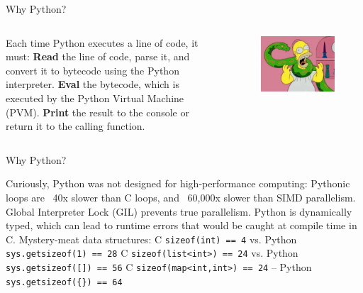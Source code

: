 \documentclass[aspectratio=169]{beamer}
\begin{document}
    \begin{frame}{Why Python?}
        \begin{columns}
            \begin{column}{0.5\linewidth}
                \begin{outline}
                    \1 Each time Python executes a line of code, it must:
                        \2 \textbf{Read} the line of code, parse it, and convert it to bytecode using the Python interpreter.
                        \2 \textbf{Eval} the bytecode, which is executed by the Python Virtual Machine (PVM).
                        \2 \textbf{Print} the result to the console or return it to the calling function.
                \end{outline}
            \end{column}
            \begin{column}{0.5\linewidth}
                \begin{figure}[H]
                    \centering
                    \includegraphics[width=0.9\linewidth]{python.png}
                \end{figure}
            \end{column}
        \end{columns}
    \end{frame}

    \begin{frame}{Why Python?}
        \begin{outline}
            \1 Curiously, Python was not designed for high-performance computing:
                \2 Pythonic loops are ~40x slower than C loops, and ~60,000x slower than SIMD parallelism.
                \2 Global Interpreter Lock (GIL) prevents true parallelism.
                \2 Python is dynamically typed, which can lead to runtime errors that would be caught at compile time in C.
                \2 Mystery-meat data structures:
                    \3 C \texttt{sizeof(int) == 4} \quad vs. \quad Python \texttt{sys.getsizeof(1) == 28}
                    \3 C \texttt{sizeof(list<int>) == 24} \quad vs. \quad Python \texttt{sys.getsizeof([]) == 56}
                    \3 C \texttt{sizeof(map<int,int>) == 24} \quad -- \quad Python \texttt{sys.getsizeof(\{\}) == 64}
        \end{outline} 
    \end{frame}
\end{document}
